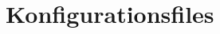 \section{Konfigurationsfiles}

\label{listing:plugins.cfg}


\label{listing:graphics.cfg}


\label{listing:resources.cfg}


